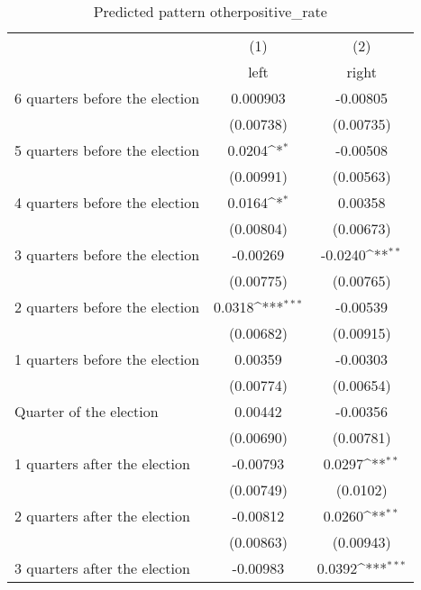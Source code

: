 \begin{table}[htbp]\centering
\def\sym#1{\ifmmode^{#1}\else\(^{#1}\)\fi}
\caption{Predicted pattern otherpositive\_rate}
\begin{tabular}{l*{2}{c}}
\hline\hline
                    &\multicolumn{1}{c}{(1)}&\multicolumn{1}{c}{(2)}\\
                    &\multicolumn{1}{c}{left}&\multicolumn{1}{c}{right}\\
\hline
 6 quarters before the election&    0.000903         &    -0.00805         \\
                    &   (0.00738)         &   (0.00735)         \\
[1em]
 5 quarters before the election&      0.0204\sym{*}  &    -0.00508         \\
                    &   (0.00991)         &   (0.00563)         \\
[1em]
 4 quarters before the election&      0.0164\sym{*}  &     0.00358         \\
                    &   (0.00804)         &   (0.00673)         \\
[1em]
 3 quarters before the election&    -0.00269         &     -0.0240\sym{**} \\
                    &   (0.00775)         &   (0.00765)         \\
[1em]
 2 quarters before the election&      0.0318\sym{***}&    -0.00539         \\
                    &   (0.00682)         &   (0.00915)         \\
[1em]
 1 quarters before the election&     0.00359         &    -0.00303         \\
                    &   (0.00774)         &   (0.00654)         \\
[1em]
Quarter of the election&     0.00442         &    -0.00356         \\
                    &   (0.00690)         &   (0.00781)         \\
[1em]
 1 quarters after the election&    -0.00793         &      0.0297\sym{**} \\
                    &   (0.00749)         &    (0.0102)         \\
[1em]
 2 quarters after the election&    -0.00812         &      0.0260\sym{**} \\
                    &   (0.00863)         &   (0.00943)         \\
[1em]
 3 quarters after the election&    -0.00983         &      0.0392\sym{***}\\

\end{tabular}
\end{table}
